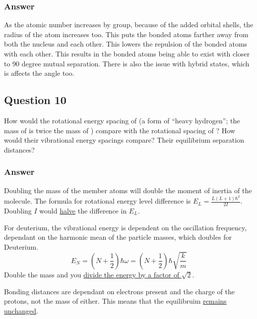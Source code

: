 \documentclass[12pt]{article}
\begin{document}
        \subsubsection{Answer}
            As the atomic number increases by group, because of the added orbital shells, the radius of the atom increases too.
            This puts the bonded atoms farther away from both the nucleus and each other.
            This lowers the repulsion of the bonded atoms with each other.
            This results in the bonded atoms being able to exist with closer to 90 degree mutual separation.
            There is also the issue with hybrid states, which is affects the angle too.
        
    \subsection{Question 10}
        How would the rotational energy spacing of  (a form of ``heavy hydrogen''; the mass of  is twice the mass of ) compare with the rotational spacing of ? 
        How would their vibrational energy spacings compare? 
        Their equilibrium separation distances?

        \subsubsection{Answer}
            Doubling the mass of the member atoms will double the moment of inertia of the molecule.
            The formula for rotational energy level difference is $E_L = \frac{L(L+1)\hbar^2}{2I}$.
            Doubling $I$ would \underline{halve} the difference in $E_L$.

            For deuterium, the vibrational energy is dependent on the oscillation frequency, dependant on the harmonic mean of the particle masses, which doubles for Deuterium.
            \begin{equation}
                E_N =   \left( N + \frac{1}{2} \right) \hbar \omega
                    =   \left( N + \frac{1}{2} \right) \hbar \sqrt{\frac{k}{m}}
            \end{equation}
            Double the mass and you \underline{divide the energy by a factor of $\sqrt{2}$}.

            Bonding distances are dependant on electrons present and the charge of the protons, not the mass of either.
            This means that the equilibruim \underline{remains unchanged}.
        
\end{document}

